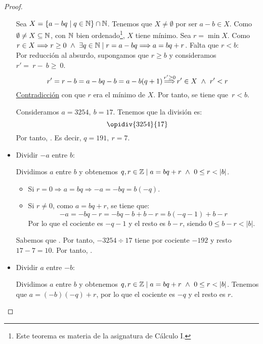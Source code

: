 \begin{proof}
\begin{itemize}
        Sea $X = \{a-bq \mid q \in \mathbb N \}\cap \mathbb N$. Tenemos que $X\neq \emptyset$ por ser $a-b\in X$. Como $\emptyset \neq X \subseteq \mathbb N$, con $\mathbb N$ bien ordenado\footnote{Este teorema es materia de la asignatura de Cálculo I.}, $X$ tiene mínimo. Sea $r=\min X$. Como $r \in X \Longrightarrow r\geq 0 \ \land \  \exists q \in \mathbb N \mid r = a-bq \Longrightarrow a=bq+r$. Falta que $r<b$: \\
    
        Por reducción al absurdo, supongamos que $r \geq b$ y consideramos $r'=~r-~b\geq~0$.
        \begin{equation*}
            r'=r-b=a-bq-b = a-b(q+1) \mathop{\Longrightarrow}^{r'\geq 0} r' \in X \ \land \  r' < r
        \end{equation*}
        \underline{Contradicción} con que $r$ era el mínimo de $X$. Por tanto, se tiene que~$r<b$.

        \begin{ejemplo} Consideramos $a=3254,~b=17$. Tenemos que la división es:
            $$\opidiv{3254}{17}$$
            Por tanto, . Es decir, $q=191,~r=7$.
        \end{ejemplo}

        \item Dividir $-a$ entre $b$:
        
        Dividimos $a$ entre $b$ y obtenemos $q, r \in \mathbb Z \mid a=bq+r \ \land \  0\leq r < |b|$.
        \begin{itemize}
            \item Si $r=0 \Longrightarrow a=bq \Longrightarrow -a = -bq = b(-q)$.
            \item Si $r\neq 0$, como $a=bq+r$, se tiene que: $$ -a = -bq-r = -bq -b + b - r = b(-q-1)+b-r$$            
            Por lo que el cociente es $-q-1$ y el resto es $b-r$, siendo $0 \leq b-r < |b|$.
        \end{itemize}

        \begin{ejemplo}
            Sabemos que . Por tanto, $-3254\div 17$ tiene por cociente $-192$ y resto $17-7=10$. Por tanto, .
        \end{ejemplo}

        \item Dividir $a$ entre $-b$:
        
        Dividimos $a$ entre $b$ y obtenemos $q, r \in \mathbb Z \mid a=bq+r \ \land \  0\leq r < |b|$.
        Tenemos que $a = (-b)(-q)+r$, por lo que el cociente es $-q$ y el resto es $r$.


\end{itemize}
\end{proof}
